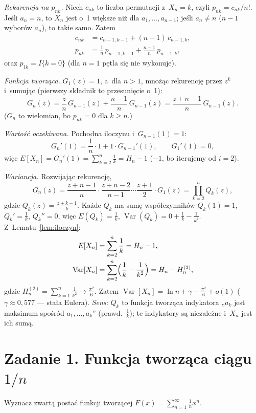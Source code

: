 \documentclass[11pt]{article}
\begin{document}
\emph{Rekurencja na $p_{nk}$.} Niech $c_{nk}$ to liczba permutacji z~$X_n=k$,
czyli $p_{nk}=c_{nk}/n!$. Jeśli $a_n=n$, to $X_n$ jest o~1 większe niż dla
$a_1,\dots,a_{n-1}$; jeśli $a_n\ne n$ ($n-1$ wyborów $a_n$), to takie samo.
Zatem
\begin{align*}
c_{nk}&=c_{n-1,k-1}+(n-1)\,c_{n-1,k},\\
p_{nk}&=\frac1n\,p_{n-1,k-1}+\frac{n-1}n\,p_{n-1,k},
\end{align*}
oraz $p_{1k}=I\{k=0\}$ (dla $n=1$ pętla się nie wykonuje).

\emph{Funkcja tworząca.} $G_1(z)=1$, a~dla $n>1$, mnożąc rekurencję przez
$z^k$ i~sumując (pierwszy składnik to przesunięcie o~1):
\[
G_n(z)=\frac zn\,G_{n-1}(z)+\frac{n-1}n\,G_{n-1}(z)=\frac{z+n-1}n\,G_{n-1}(z).
\]
($G_n$ to wielomian, bo $p_{nk}=0$ dla $k\ge n$.)

\emph{Wartość oczekiwana.} Pochodna iloczynu i~$G_{n-1}(1)=1$:
\[
G_n'(1)=\frac1n\cdot1+1\cdot G_{n-1}'(1),\qquad G_1'(1)=0,
\]
więc $E[X_n]=G_n'(1)=\sum_{k=2}^n\frac1k=H_n-1$ ($-1$, bo iterujemy od $i=2$).

\emph{Wariancja.} Rozwijając rekurencję,
\[
G_n(z)=\frac{z+n-1}n\cdot\frac{z+n-2}{n-1}\cdots\frac{z+1}2\cdot G_1(z)
=\prod_{k=2}^nQ_k(z),
\]
gdzie $Q_k(z)=\frac{z+k-1}k$. Każde $Q_k$ ma sumę współczynników $Q_k(1)=1$,
$Q_k'=\frac1k$, $Q_k''=0$, więc $E(Q_k)=\frac1k$,
$\operatorname{Var}(Q_k)=0+\frac1k-\frac1{k^2}$. Z~Lematu~\ref{lem:iloczyn}:
\begin{align*}
E[X_n]&=\sum_{k=2}^n\frac1k=H_n-1,\\
\operatorname{Var}[X_n]&=\sum_{k=2}^n\Bigl(\frac1k-\frac1{k^2}\Bigr)
=H_n-H_n^{(2)},
\end{align*}
gdzie $H_n^{(2)}=\sum_{k=1}^n\frac1{k^2}\to\frac{\pi^2}6$. Zatem
$\operatorname{Var}[X_n]=\ln n+\gamma-\frac{\pi^2}6+o(1)$ ($\gamma\approx0{,}577$
--- stała Eulera).
\emph{Sens:} $Q_k$ to funkcja tworząca indykatora „$a_k$ jest maksimum
spośród $a_1,\dots,a_k$” (prawd.\ $\frac1k$); te indykatory są niezależne
i~$X_n$ jest ich sumą.

\section{Zadanie 1. Funkcja tworząca ciągu $1/n$}
\begin{tresc}
Wyznacz zwartą postać funkcji tworzącej
$F(x)=\sum_{n=1}^{\infty}\frac1nx^n$.
\end{tresc}
\end{document}
